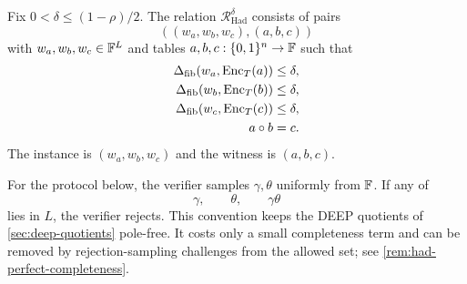 \begin{definition}
\label{def:hadamard-relation}
Fix $0<\delta\le(1-\rho)/2$.  The relation $\mathcal R^{\delta}_{\mathrm{Had}}$ consists of pairs
\[
  ((w_a,w_b,w_c),(a,b,c))
\]
with $w_a,w_b,w_c\in\mathbb{F}^L$ and tables $a,b,c:\{0,1\}^n\to\mathbb{F}$ such that
\begin{align}
  \Delta_{\mathrm{fib}}(w_a,\operatorname{Enc}_T(a))&\le\delta,
  \label{eq:had-relation-a}\\
  \Delta_{\mathrm{fib}}(w_b,\operatorname{Enc}_T(b))&\le\delta,
  \label{eq:had-relation-b}\\
  \Delta_{\mathrm{fib}}(w_c,\operatorname{Enc}_T(c))&\le\delta,
  \label{eq:had-relation-c}\\
  a\circ b&=c.
  \label{eq:had-relation-product}
\end{align}
The instance is $(w_a,w_b,w_c)$ and the witness is $(a,b,c)$.
\end{definition}

For the protocol below, the verifier samples $\gamma,\theta$ uniformly from $\mathbb{F}$.  If any of
\begin{equation}
  \gamma,\qquad \theta,\qquad \gamma\theta
  \label{eq:had-poles}
\end{equation}
lies in $L$, the verifier rejects.  This convention keeps the DEEP quotients of \cref{sec:deep-quotients} pole-free.  It costs only a small completeness term and can be removed by rejection-sampling challenges from the allowed set; see \cref{rem:had-perfect-completeness}.


